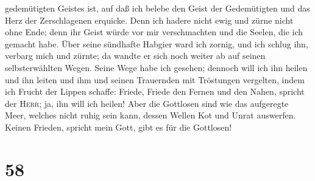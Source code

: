 gedemütigten Geistes ist, auf daß ich belebe den Geist der Gedemütigten
und das Herz der Zerschlagenen erquicke.  Denn ich hadere
nicht ewig und zürne nicht ohne Ende; denn ihr Geist würde vor mir
verschmachten und die Seelen, die ich gemacht habe.  Über
seine sündhafte Habgier ward ich zornig, und ich schlug ihn, verbarg
mich und zürnte; da wandte er sich noch weiter ab auf seinen
selbsterwählten Wegen.  Seine Wege habe ich gesehen;
dennoch will ich ihn heilen und ihn leiten und ihm und seinen Trauernden
mit Tröstungen vergelten,  indem ich Frucht der Lippen
schaffe: Friede, Friede den Fernen und den Nahen, spricht der
\textsc{Herr}; ja, ihn will ich heilen!  Aber die
Gottlosen sind wie das aufgeregte Meer, welches nicht ruhig sein kann,
dessen Wellen Kot und Unrat auswerfen.  Keinen Frieden,
spricht mein Gott, gibt es für die Gottlosen!

\hypertarget{section-57}{%
\section{58}\label{section-57}}

